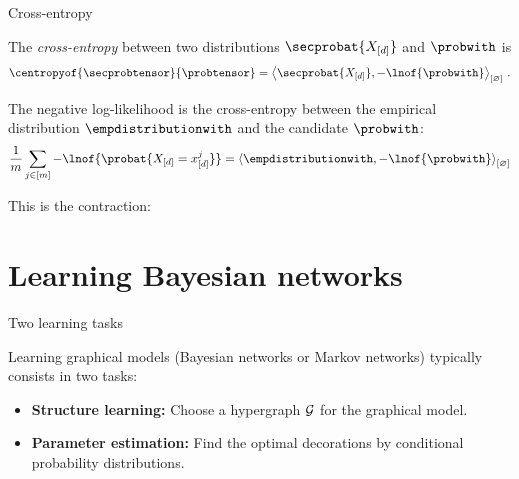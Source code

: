 \documentclass{beamer}
\begin{document}
    \begin{frame}{Cross-entropy}

        The \emph{cross-entropy} between two distributions $\secprobat{\shortcatvariables}$ and $\probwith$ is
        \begin{align*}
            \centropyof{\secprobtensor}{\probtensor}
            = \contraction{\secprobat{\shortcatvariables},-\lnof{\probwith}} \, .
        \end{align*}

        The negative log-likelihood is the cross-entropy between the empirical distribution $\empdistributionwith$ and the candidate $\probwith$:
        \begin{align*}
            \frac{1}{\datdim}\sum_{\datindexin}
            -\lnof{\probat{\shortcatvariables=\shortcatindices^{\datindex}}}
            = \contraction{\empdistributionwith,-\lnof{\probwith}}
        \end{align*}

        This is the contraction:

    \end{frame}


    \section{Learning Bayesian networks}

    \begin{frame}{Two learning tasks}

        Learning graphical models (Bayesian networks or Markov networks) typically consists in two tasks:
        \begin{itemize}
            \item {\bf Structure learning:} Choose a hypergraph $\mathcal{G}$ for the graphical model.
            \item {\bf Parameter estimation:} Find the optimal decorations by conditional probability distributions.
        \end{itemize}

    \end{frame}
\end{document}
